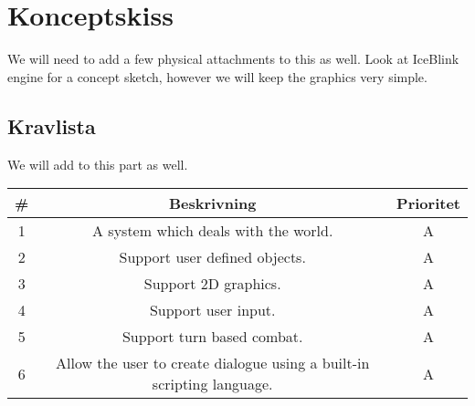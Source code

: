 \documentclass[12pt,a4paper]{article}
\begin{document}
\section{Konceptskiss}

We will need to add a few physical attachments to this as well.
Look at IceBlink engine for a concept sketch, however we will keep the graphics very simple.





\subsection{Kravlista}
We will add to this part as well.
\bigskip

\begin{tabular}{|c|c|c|}
\hline
\# & \textbf{Beskrivning} & \textbf{Prioritet} \\ \hline
1 & A system which deals with the world. & A \\ \hline
2 & Support user defined objects. & A \\ \hline
3 & Support 2D graphics. & A \\ \hline
4 & Support user input. & A \\ \hline
5 & Support turn based combat. & A \\ \hline
6 & Allow the user to create dialogue using a built-in scripting language. & A \\ \hline
\end{tabular}
\end{document}
